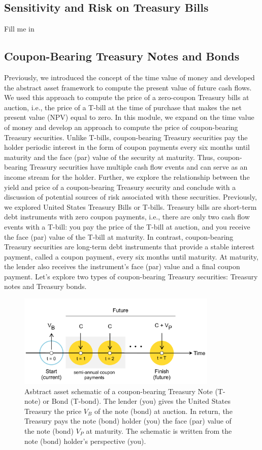 \documentclass[11pt]{article}
\theoremstyle{definition}
\begin{document}
\subsection{Sensitivity and Risk on Treasury Bills}
Fill me in

\subsection{Coupon-Bearing Treasury Notes and Bonds}
Previously, we introduced the concept of the time value of money and developed the abstract asset framework to compute the present value of future cash flows.
We used this approach to compute the price of a zero-coupon Treasury bills at auction, 
i.e., the price of a T-bill at the time of purchase that makes the net present value (NPV) equal to zero.
In this module, we expand on the time value of money and develop an approach to compute the price of coupon-bearing Treasury securities.
Unlike T-bills, coupon-bearing Treasury securities pay the holder periodic interest in the form of coupon payments every six months until maturity and the face (par) value of the security at maturity.
Thus, coupon-bearing Treasury securities have multiple cash flow events and can serve as an income stream for the holder.
Further, we explore the relationship between the yield and price of a coupon-bearing Treasury security and conclude with a discussion of potential sources of 
risk associated with these securities. Previously, we explored United States Treasury Bills or T-bills. Treasury bills are short-term debt instruments with zero coupon payments, 
i.e., there are only two cash flow events with a T-bill: you pay the price of the T-bill at auction, and you receive the face (par) value of the T-bill at maturity. 
In contrast, coupon-bearing Treasury securities are long-term debt instruments that provide a stable interest payment, called a coupon payment, every six months until maturity.
At maturity, the lender also receives the instrument's face (par) value and a final coupon payment.
Let's explore two types of coupon-bearing Treasury securities: Treasury notes and Treasury bonds.
\begin{figure}[h]
    \centering
    \includegraphics[width=0.85\textwidth]{./figs/Fig-Bond-Asset-Timeline-Schematic.pdf}
    \caption{Asbtract asset schematic of a coupon-bearing Treasury Note (T-note) or Bond (T-bond). 
	The lender (you) gives the United States Treasury 
    the price $V_{B}$ of the note (bond) at auction. In return, the Treasury pays the note (bond) holder (you) the face (par) value of the note (bond) $V_{P}$ at maturity. 
	The schematic is written from the note (bond) holder's perspective (you).}\label{fig:govt-note-bond-schematic}
\end{figure}
\end{document}
